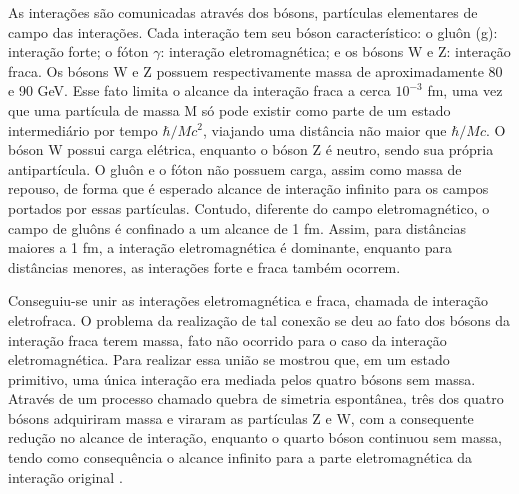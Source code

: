 As interações são comunicadas através dos bósons, partículas elementares
de campo das interações. Cada interação tem seu
bóson característico: o gluôn (g): interação forte; o fóton $\gamma$: interação 
eletromagnética; e os bósons W e Z: interação fraca.  
Os bósons W e Z possuem respectivamente massa de aproximadamente
80 e 90 GeV. Esse fato limita o alcance da interação fraca a cerca $10^{-3}$ fm,
uma vez que uma partícula de massa M só pode existir como parte de um estado
intermediário por tempo $\hbar/Mc^2$, viajando uma distância não maior que
$\hbar/Mc$. O bóson W possui carga elétrica, enquanto o bóson Z é neutro, sendo sua própria antipartícula.
O gluôn e o fóton não possuem carga, assim como massa de repouso, de forma que é esperado alcance de
interação infinito para os campos portados por essas partículas. 
Contudo, diferente do campo eletromagnético, o campo de
gluôns é confinado a um alcance de 1 fm. 
Assim, para distâncias maiores a 1 fm, a interação eletromagnética é dominante,
enquanto para distâncias menores, as interações forte e fraca também ocorrem.

\begin{table}
\centering
{}
\caption[As quatro interações fundamentais]{As quatro interações fundamentais. A intensidade relativa se dá em
relação a interação forte. Adaptado de \cite{Beiser}.}
\label{tab:interacoes}
\end{table}

Conseguiu-se unir as interações eletromagnética e fraca, chamada de interação
eletrofraca. O problema da realização de tal conexão se deu ao fato dos
bósons da interação fraca terem massa, fato não ocorrido para o caso da
interação eletromagnética. Para realizar essa união se mostrou que, em um
estado primitivo, uma única interação era mediada pelos quatro bósons sem massa.
Através de um processo chamado quebra de simetria espontânea, três dos quatro
bósons adquiriram massa e viraram as partículas Z e W, com a consequente
redução no alcance de interação, enquanto o quarto bóson continuou sem massa,
tendo como consequência o alcance infinito para a parte eletromagnética da
interação original \cite{Beiser}.

